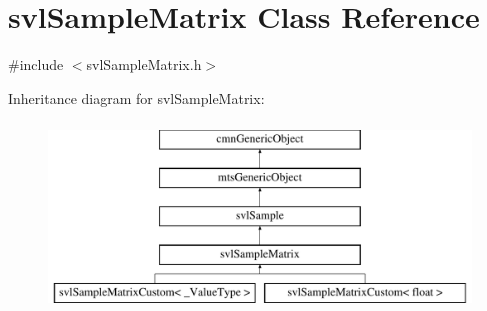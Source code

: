 \hypertarget{classsvl_sample_matrix}{\section{svl\-Sample\-Matrix Class Reference}
\label{classsvl_sample_matrix}
}


{\ttfamily \#include $<$svl\-Sample\-Matrix.\-h$>$}

Inheritance diagram for svl\-Sample\-Matrix\-:\begin{figure}[H]
\begin{center}
\leavevmode
\includegraphics[height=5.000000cm]{d1/dd4/classsvl_sample_matrix}
\end{center}
\end{figure}
